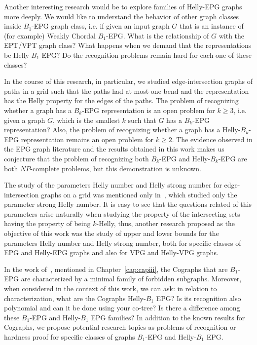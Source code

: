 Another interesting research would be to explore families of Helly-EPG graphs more deeply. We would like to understand the behavior of other graph classes inside $B_1$-EPG graph class, i.e. if given an  input graph $G$ that is an instance of (for example) Weakly Chordal $B_1$-EPG. What is the relationship of $G$ with the EPT/VPT graph class? What happens when we demand that the representations be Helly-$B_1$ EPG? Do the  recognition  problems remain hard for each one of these classes? 




In the course of this research, in particular, we studied edge-intersection graphs of paths in a grid such that the paths had at most one bend and the representation has the Helly property for the edges of the paths. The problem of recognizing whether a graph has a  $B_{k}$-EPG representation is an open problem for $k\geq 3$, i.e. given a graph $ G$, which is the smallest $k$ such that $ G $ has a $ B_{k}$-EPG representation? Also, the problem of recognizing whether a graph has a  Helly-$B_{k}$-EPG representation remains an open problem for $ k\geq 2$. The evidence observed in the EPG graph literature and the results obtained in this work makes us conjecture that the problem of recognizing both $B_{k}$-EPG and Helly-$B_{k}$-EPG  are both $NP$-complete problems, but this demonstration is unknown.

The study of the parameters Helly number and Helly strong number for edge-intersection graphs on a grid was mentioned only in~\cite{golumbic2009, golumbic2013}, which studied only the parameter strong Helly number. It is easy to see that the questions related of this parameters arise naturally when studying the property of the intersecting sets having the property of being $k$-Helly, thus, another research proposed as the objective of this work was the study of upper and lower bounds for the parameters Helly number and Helly strong number, both for specific classes of EPG and Helly-EPG graphs and also for VPG and Helly-VPG graphs.

In the work of~\citet{cohen2014}, mentioned in Chapter~\ref{cap:capiii}, the Cographs that are $B_1$-EPG are characterized by a minimal family of forbidden subgraphs. Moreover, when considered in the context of this work, we can ask: in relation to characterization, what are the Cographs Helly-$B_1$  EPG? Is its recognition also polynomial and can it be done using your co-tree? Is there a difference among these $B_1$-EPG and Helly-$B_1$  EPG families? In addition to the known results for Cographs, we propose potential research topics as problems of recognition or hardness proof  for specific classes of graphs $B_1$-EPG and Helly-$B_1$ EPG.


